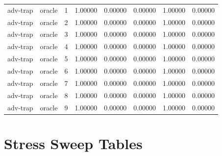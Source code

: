 \documentclass{article}
\begin{document}
\begin{center}
\begin{longtable}{llllllll}
adv-trap & oracle & 1 & 1.00000 & 0.00000 & 0.00000 & 1.00000 & 0.00000 \\
adv-trap & oracle & 2 & 1.00000 & 0.00000 & 0.00000 & 1.00000 & 0.00000 \\
adv-trap & oracle & 3 & 1.00000 & 0.00000 & 0.00000 & 1.00000 & 0.00000 \\
adv-trap & oracle & 4 & 1.00000 & 0.00000 & 0.00000 & 1.00000 & 0.00000 \\
adv-trap & oracle & 5 & 1.00000 & 0.00000 & 0.00000 & 1.00000 & 0.00000 \\
adv-trap & oracle & 6 & 1.00000 & 0.00000 & 0.00000 & 1.00000 & 0.00000 \\
adv-trap & oracle & 7 & 1.00000 & 0.00000 & 0.00000 & 1.00000 & 0.00000 \\
adv-trap & oracle & 8 & 1.00000 & 0.00000 & 0.00000 & 1.00000 & 0.00000 \\
adv-trap & oracle & 9 & 1.00000 & 0.00000 & 0.00000 & 1.00000 & 0.00000 \\
\bottomrule
\end{longtable}
\renewcommand{\arraystretch}{1.0}
\end{center}

\clearpage
\section{Stress Sweep Tables}
\end{document}
